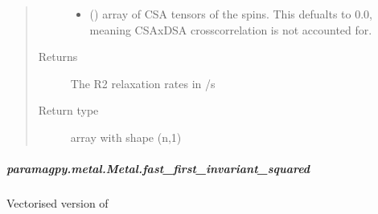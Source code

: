 \documentclass[a4paper,10pt,english]{sphinxmanual}
\begin{document}
\begin{fulllineitems}
\begin{fulllineitems}
\begin{fulllineitems}
\begin{quote}
\begin{description}
\begin{itemize}
\item {} 
 (\sphinxstyleliteralemphasis{\sphinxupquote{ (}}\sphinxstyleliteralemphasis{\sphinxupquote{,}}\sphinxstyleliteralemphasis{\sphinxupquote{,}}\sphinxstyleliteralemphasis{\sphinxupquote{) }}\sphinxstyleliteralemphasis{\sphinxupquote{(}}\sphinxstyleliteralemphasis{\sphinxupquote{)}}) \textendash{} array of CSA tensors of the spins.
This defualts to 0.0, meaning CSAxDSA crosscorrelation is
not accounted for.

\end{itemize}

\item[{Returns}] \leavevmode
{} \textendash{} The R2 relaxation rates in /s

\item[{Return type}] \leavevmode
array with shape (n,1)

\end{description}\end{quote}

\end{fulllineitems}



\subparagraph{paramagpy.metal.Metal.fast\_first\_invariant\_squared}
\label{\detokenize{reference/generated/paramagpy.metal.Metal.fast_first_invariant_squared:paramagpy-metal-metal-fast-first-invariant-squared}}\label{\detokenize{reference/generated/paramagpy.metal.Metal.fast_first_invariant_squared::doc}}

\begin{fulllineitems}
\label{\detokenize{reference/generated/paramagpy.metal.Metal.fast_first_invariant_squared:paramagpy.metal.Metal.fast_first_invariant_squared}}
Vectorised version of
{\hyperref[\detokenize{reference/generated/paramagpy.metal.Metal.first_invariant_squared:paramagpy.metal.Metal.first_invariant_squared}]{}}


\end{fulllineitems}
\end{fulllineitems}
\end{fulllineitems}
\end{document}
